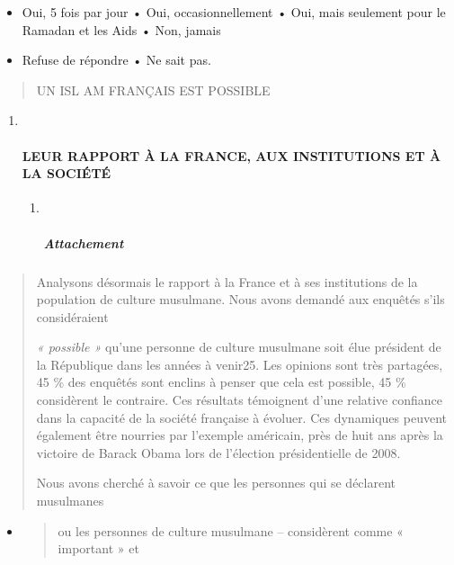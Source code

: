 \begin{itemize}
\item
  Oui, 5 fois par jour • Oui, occasionnellement • Oui, mais seulement
  pour le Ramadan et les Aids • Non, jamais
\item
  Refuse de répondre • Ne sait pas.
\end{itemize}

\begin{quote}
UN ISL AM FRANÇAIS EST POSSIBLE
\end{quote}

\begin{enumerate}
\def\labelenumi{\arabic{enumi}.}
\item ~
  \hypertarget{leur-rapport-uxe0-la-france-aux-institutions-et-uxe0-la-sociuxe9tuxe9}{%
  \paragraph{LEUR RAPPORT À LA FRANCE, AUX INSTITUTIONS ET À LA
  SOCIÉTÉ}\label{leur-rapport-uxe0-la-france-aux-institutions-et-uxe0-la-sociuxe9tuxe9}}

  \begin{enumerate}
  \def\labelenumii{\arabic{enumii}.}
  \item ~
    \hypertarget{attachement}{%
    \subparagraph{Attachement}\label{attachement}}
  \end{enumerate}
\end{enumerate}

\begin{quote}
Analysons désormais le rapport à la France et à ses institutions de la
population de culture musulmane. Nous avons demandé aux enquêtés s'ils
considéraient

\emph{« possible »} qu'une personne de culture musulmane soit élue
président de la République dans les années à venir25. Les opinions sont
très partagées, 45 \% des enquêtés sont enclins à penser que cela est
possible, 45 \% considèrent le contraire. Ces résultats témoignent d'une
relative confiance dans la capacité de la société française à évoluer.
Ces dynamiques peuvent également être nourries par l'exemple américain,
près de huit ans après la victoire de Barack Obama lors de l'élection
présidentielle de 2008.

Nous avons cherché à savoir ce que les personnes qui se déclarent
musulmanes
\end{quote}

\begin{itemize}
\item
  \begin{quote}
  ou les personnes de culture musulmane -- considèrent comme « important
  » et
  \end{quote}
\end{itemize}

